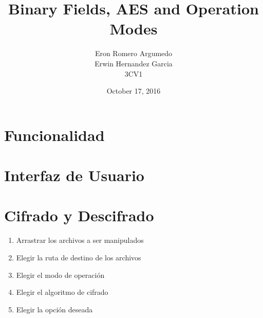 \documentclass{article}
\title{Binary Fields, AES and Operation Modes}
\author{Eron Romero Argumedo\\Erwin Hernandez Garcia\\3CV1}
\date{October 17, 2016}
\begin{document}
	\maketitle
	\tableofcontents
	\listoffigures
	\newpage
	\section{Funcionalidad}
	\section{Interfaz de Usuario}
	\section{Cifrado y Descifrado}
	\begin{enumerate}
		\item Arrastrar los archivos a ser manipulados
		\item Elegir la ruta de destino de los archivos
		\item Elegir el modo de operación
		\item Elegir el algoritmo de cifrado
		\item Elegir la opción deseada
	\end{enumerate}
\end{document}
